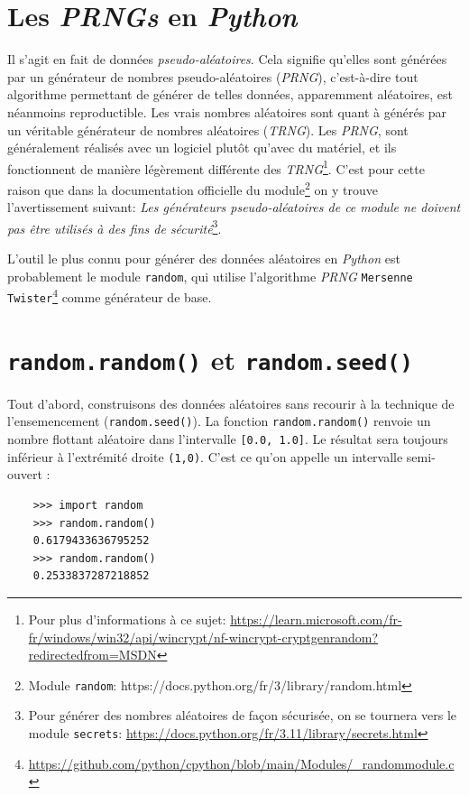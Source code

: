 \documentclass[a4paper,12pt]{book}
\begin{document}
\section{Les \textit{PRNGs} en \textit{Python}}
Il s'agit en fait de données \textit{pseudo-aléatoires}. Cela signifie qu'elles sont générées par un générateur de nombres pseudo-aléatoires (\textit{PRNG}), c'est-à-dire tout algorithme permettant de générer de telles données, apparemment aléatoires, est néanmoins reproductible. Les \og vrais\fg{} nombres aléatoires sont quant à générés par un véritable générateur de nombres aléatoires (\textit{TRNG}). Les \textit{PRNG}, sont généralement réalisés avec un logiciel plutôt qu'avec du matériel, et ils fonctionnent de manière légèrement différente des \textit{TRNG}\footnote{Pour plus d'informations à ce sujet: \url{https://learn.microsoft.com/fr-fr/windows/win32/api/wincrypt/nf-wincrypt-cryptgenrandom?redirectedfrom=MSDN}}. C'est pour cette raison que dans la documentation officielle du module\footnote{Module \texttt{random}: https://docs.python.org/fr/3/library/random.html} on y trouve l'avertissement suivant: \og \textit{Les générateurs pseudo-aléatoires de ce module ne doivent pas être utilisés à des fins de sécurité}\fg{}\footnote{Pour générer des nombres aléatoires de façon sécurisée, on se tournera vers le module \texttt{secrets}: \url{https://docs.python.org/fr/3.11/library/secrets.html}}.  
\medskip

L'outil le plus connu pour générer des données aléatoires en \textit{Python} est probablement le module \texttt{random}, qui utilise l'algorithme \textit{PRNG} \texttt{Mersenne Twister}\footnote{\url{https://github.com/python/cpython/blob/main/Modules/_randommodule.c}} comme générateur de base.

\section{\texttt{random.random()} et \texttt{random.seed()}}
Tout d'abord, construisons des données aléatoires sans recourir à la technique de l'ensemencement (\texttt{random.seed()}). La fonction \texttt{random.random()} renvoie un nombre flottant aléatoire dans l'intervalle \texttt{[0.0, 1.0]}. Le résultat sera toujours inférieur à l'extrémité droite \texttt{(1,0)}. C'est ce qu'on appelle un intervalle semi-ouvert : 
\begin{verbatim}
    >>> import random
    >>> random.random()
    0.6179433636795252
    >>> random.random()
    0.2533837287218852
\end{verbatim}
\medskip
\end{document}
